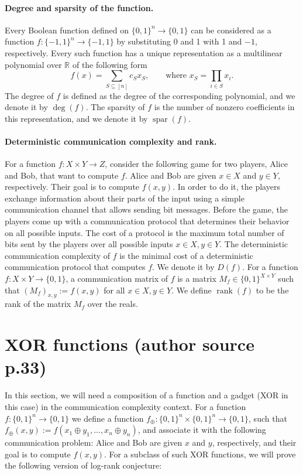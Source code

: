 \documentclass[10pt,a4paper]{article}
\newcommand{\bits}{\{0,1\}}
\begin{document}
\paragraph{Degree and sparsity of the function.} Every Boolean function defined on $\bits^n\to\bits$ can be considered as a function $f:\{-1,1\}^n\to\{-1,1\}$ by substituting 0 and 1 with 1 and $-1$, respectively. Every such function has a unique representation as a multilinear polynomial over $\mathbb R$ of the following form
\[f(x)=\sum_{S\subseteq[n]}c_Sx_S,\qquad\text{where }x_S=\prod_{i\in S}x_i.\]
The degree of $f$ is defined as the degree of the corresponding polynomial, and we denote it by $\deg(f)$. The sparsity of $f$ is the number of nonzero coefficients in this representation, and we denote it by $\operatorname{spar}(f)$.
\paragraph{Deterministic communication complexity and rank.} For a function $f:X\times Y\to Z$, consider the following game for two players, Alice and Bob, that want to compute $f$. Alice and Bob are given $x\in X$ and $y\in Y$, respectively. Their goal is to compute $f(x,y)$. In order to do it, the players exchange information about their parts of the input using a simple communication channel that allows sending bit messages. Before the game, the players come up with a communication protocol that determines their behavior on all possible inputs. The cost of a protocol is the maximum total number of bits sent by the players over all possible inputs $x\in X,y\in Y$. The deterministic communication complexity of $f$ is the minimal cost of a deterministic communication protocol that computes $f$. We denote it by $D(f)$.
For a function $f:X\times Y\to\bits$, a communication matrix of $f$ is a matrix $M_f\in\bits^{X\times Y}$ such that $(M_f)_{x,y}:=f(x,y)$ for all $x\in X,y\in Y$. We define $\operatorname{rank}(f)$ to be the rank of the matrix $M_f$ over the reals.
\section*{XOR functions (author source p.33)}
In this section, we will need a composition of a function and a gadget (XOR in this case) in the communication complexity context. For a function $f:\bits^n\to\bits$ we define a function $f_\oplus:\bits^n\times\bits^n\to\bits$, such that $f_\oplus(x,y):=f(x_1\oplus y_1,\ldots,x_n\oplus y_n)$, and associate it with the following communication problem: Alice and Bob are given $x$ and $y$, respectively, and their goal is to compute $f(x,y)$. For a subclass of such XOR functions, we will prove the following version of log-rank conjecture:
\end{document}
